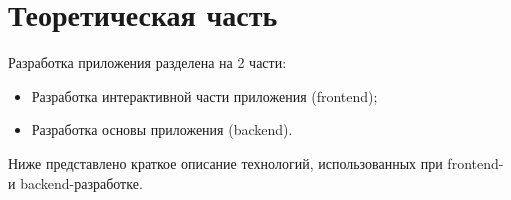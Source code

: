 \section{Теоретическая часть}

Разработка приложения разделена на 2 части:

\begin{itemize}
  \item Разработка интерактивной части приложения (frontend);
  \item Разработка основы приложения (backend).
\end{itemize}

Ниже представлено краткое описание технологий, использованных при frontend- и backend-разработке.





